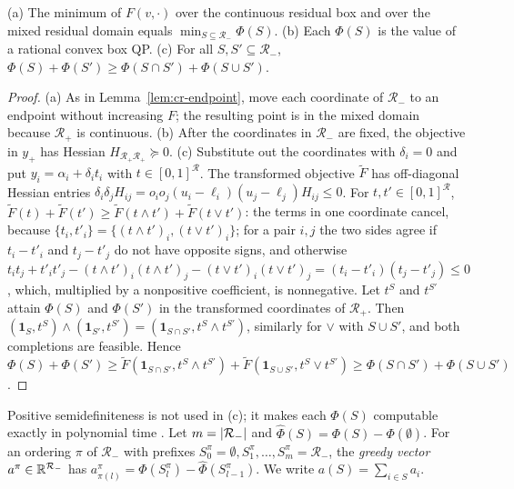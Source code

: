 \begin{proposition}\label{prop:cr-submod}
(a) The minimum of $F(v,\cdot)$ over the continuous residual box and over
the mixed residual domain equals $\min_{S\subseteq\mathcal R_-}\Phi(S)$.
(b) Each $\Phi(S)$ is the value of a rational convex box QP.
(c) For all $S,S'\subseteq\mathcal R_-$,
$\Phi(S)+\Phi(S')\ge\Phi(S\cap S')+\Phi(S\cup S')$.
\end{proposition}

\begin{proof}
(a) As in Lemma~\ref{lem:cr-endpoint}, move each coordinate of
$\mathcal R_-$ to an endpoint without increasing $F$; the resulting point is
in the mixed domain because $\mathcal R_+$ is continuous. (b) After the
coordinates in $\mathcal R_-$ are fixed, the objective in $y_+$ has Hessian
$H_{\mathcal R_+\mathcal R_+}\succeq0$.
(c) Substitute out the coordinates with $\delta_i=0$ and put
$y_i=\alpha_i+\delta_it_i$ with $t\in[0,1]^{\mathcal R}$. The transformed
objective $\tilde F$ has off-diagonal Hessian entries
$\delta_i\delta_jH_{ij}=o_io_j(u_i-\ell_i)(u_j-\ell_j)H_{ij}\le0$. For
$t,t'\in[0,1]^{\mathcal R}$,
$\tilde F(t)+\tilde F(t')\ge\tilde F(t\wedge t')+\tilde F(t\vee t')$: the
terms in one coordinate cancel, because $\{t_i,t'_i\}=\{(t\wedge
t')_i,(t\vee t')_i\}$; for a pair $i,j$ the two sides agree if $t_i-t'_i$ and
$t_j-t'_j$ do not have opposite signs, and otherwise
$t_it_j+t'_it'_j-(t\wedge t')_i(t\wedge t')_j-(t\vee t')_i(t\vee t')_j
=(t_i-t'_i)(t_j-t'_j)\le0$, which, multiplied by a nonpositive coefficient,
is nonnegative. Let $t^S$ and $t^{S'}$ attain $\Phi(S)$ and $\Phi(S')$ in
the transformed coordinates of $\mathcal R_+$. Then
$(\mathbf 1_S,t^S)\wedge(\mathbf 1_{S'},t^{S'})
=(\mathbf 1_{S\cap S'},t^S\wedge t^{S'})$, similarly for $\vee$ with
$S\cup S'$, and both completions are feasible. Hence
$\Phi(S)+\Phi(S')\ge\tilde F(\mathbf 1_{S\cap S'},t^S\wedge t^{S'})
+\tilde F(\mathbf 1_{S\cup S'},t^S\vee t^{S'})\ge\Phi(S\cap S')+\Phi(S\cup S')$.
\end{proof}

Positive semidefiniteness is not used in (c); it makes each $\Phi(S)$
computable exactly in polynomial time \cite{KozlovTarasovKhachiyan1980}.
Let $m=\lvert \mathcal R_-\rvert$ and $\hat\Phi(S)=\Phi(S)-\Phi(\emptyset)$. For an
ordering $\pi$ of $\mathcal R_-$ with prefixes
$S^\pi_0=\emptyset,S^\pi_1,\dots,S^\pi_m=\mathcal R_-$, the \emph{greedy
vector} $a^\pi\in\mathbb R^{\mathcal R_-}$ has
$a^\pi_{\pi(l)}=\hat\Phi(S^\pi_l)-\hat\Phi(S^\pi_{l-1})$. We write
$a(S)=\sum_{i\in S}a_i$.

